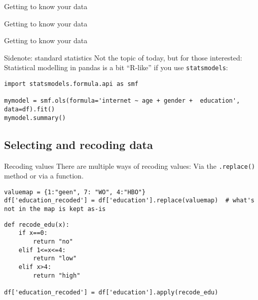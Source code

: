 \begin{frame}[fragile]{Getting to know your data}
\end{frame}


\begin{frame}[fragile]{Getting to know your data}
\end{frame}


\begin{frame}[fragile]{Getting to know your data}
\end{frame}






\begin{frame}[fragile]{Sidenote: standard statistics}
Not the topic of today, but for those interested: Statistical modelling in pandas is a bit ``R-like'' if you use \texttt{statsmodels}:

\begin{verbatim}
import statsmodels.formula.api as smf

mymodel = smf.ols(formula='internet ~ age + gender +  education', data=df).fit()
mymodel.summary()
\end{verbatim}    



\end{frame}










\subsection{Selecting and recoding data}




\begin{frame}[fragile]{Recoding values}
There are multiple ways of recoding values: Via the \texttt{.replace()} method or via a function.

\begin{verbatim}
valuemap = {1:"geen", 7: "WO", 4:"HBO"}
df['education_recoded'] = df['education'].replace(valuemap)  # what's not in the map is kept as-is
\end{verbatim}


\begin{verbatim}
def recode_edu(x):
    if x==0:
        return "no"
    elif 1<=x<=4:
        return "low"
    elif x>4:
        return "high"
    
df['education_recoded'] = df['education'].apply(recode_edu)
\end{verbatim}



\end{frame}





